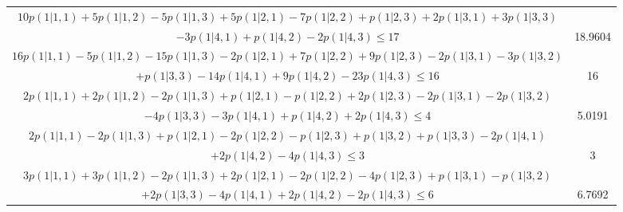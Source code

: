 \documentclass[11pt]{article}
\begin{document}
\begin{table}[htbp]
{\begin{tabular}{|c|c|}
      $10p(1|1,1) +5p(1|1,2) -5p(1|1,3) +5p(1|2,1) -7p(1|2,2) +p(1|2,3) +2p(1|3,1) +3p(1|3,3) $&\\$-3p(1|4,1) +p(1|4,2) -2p(1|4,3) \leqslant 17$ & 18.9604\\ \hline

      $16p(1|1,1) -5p(1|1,2) -15p(1|1,3) -2p(1|2,1) +7p(1|2,2) +9p(1|2,3) -2p(1|3,1) -3p(1|3,2) $&\\$+p(1|3,3) -14p(1|4,1) +9p(1|4,2) -23p(1|4,3) \leqslant 16$ & 16\\ \hline

      $2p(1|1,1) +2p(1|1,2) -2p(1|1,3) +p(1|2,1) -p(1|2,2) +2p(1|2,3) -2p(1|3,1) -2p(1|3,2) $&\\$-4p(1|3,3) -3p(1|4,1) +p(1|4,2) +2p(1|4,3) \leqslant 4$ &  5.0191 \\ \hline

      $2p(1|1,1) -2p(1|1,3) +p(1|2,1) -2p(1|2,2) -p(1|2,3) +p(1|3,2) +p(1|3,3) -2p(1|4,1)$&\\$ +2p(1|4,2) -4p(1|4,3) \leqslant 3$ & 3\\ \hline

      $3p(1|1,1) +3p(1|1,2) -2p(1|1,3) +2p(1|2,1) -2p(1|2,2) -4p(1|2,3) +p(1|3,1) -p(1|3,2) $&\\$ +2p(1|3,3) -4p(1|4,1) +2p(1|4,2) -2p(1|4,3) \leqslant 6$ &  6.7692\\
      \hline
    \end{tabular}
}
\end{table}
\end{document}
